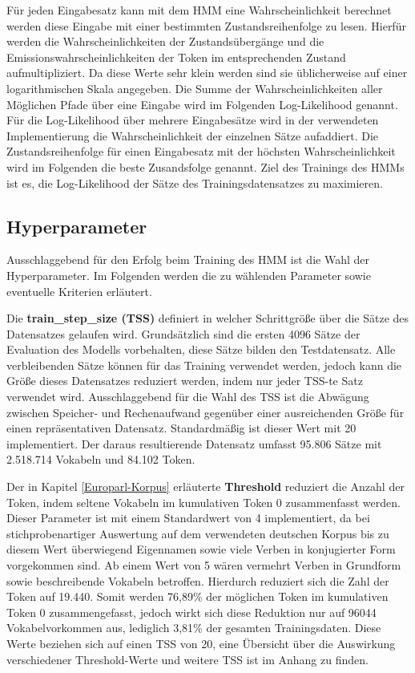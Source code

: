 \documentclass[conference]{IEEEtran}
\begin{document}
Für jeden Eingabesatz kann mit dem HMM eine Wahrscheinlichkeit berechnet werden diese Eingabe mit einer bestimmten Zustandsreihenfolge zu lesen.
Hierfür werden die Wahrscheinlichkeiten der Zustandsübergänge und die Emissionswahrscheinlichkeiten der Token im entsprechenden Zustand aufmultipliziert. 
Da diese Werte sehr klein werden sind sie üblicherweise auf einer logarithmischen Skala angegeben.
Die Summe der Wahrscheinlichkeiten aller Möglichen Pfade über eine Eingabe wird im Folgenden Log-Likelihood genannt.
Für die Log-Likelihood über mehrere Eingabesätze wird in der verwendeten Implementierung die Wahrscheinlichkeit der einzelnen Sätze aufaddiert.
Die Zustandsreihenfolge für einen Eingabesatz mit der höchsten Wahrscheinlichkeit wird im Folgenden die beste Zusandsfolge genannt.
Ziel des Trainings des HMMs ist es, die Log-Likelihood der Sätze des Trainingsdatensatzes zu maximieren.

\subsection{Hyperparameter}
Ausschlaggebend für den Erfolg beim Training des HMM ist die Wahl der Hyperparameter.
Im Folgenden werden die zu wählenden Parameter sowie eventuelle Kriterien erläutert.

Die \textbf{train\_step\_size (TSS)} definiert in welcher Schrittgröße über die Sätze des Datensatzes gelaufen wird. 
Grundsätzlich sind die ersten 4096 Sätze der Evaluation des Modells vorbehalten, diese Sätze bilden den Testdatensatz. 
Alle verbleibenden Sätze können für das Training verwendet werden, jedoch kann die Größe dieses Datensatzes reduziert werden, indem nur jeder TSS-te Satz verwendet wird. 
Ausschlaggebend für die Wahl des TSS ist die Abwägung zwischen Speicher- und Rechenaufwand gegenüber einer ausreichenden Größe für einen repräsentativen Datensatz. 
Standardmäßig ist dieser Wert mit 20 implementiert.
Der daraus resultierende Datensatz umfasst 95.806 Sätze mit 2.518.714 Vokabeln und 84.102 Token.

Der in Kapitel \ref{Europarl-Korpus} erläuterte \textbf{Threshold} reduziert die Anzahl der Token, indem seltene Vokabeln im kumulativen Token 0 zusammenfasst werden.
Dieser Parameter ist mit einem Standardwert von 4 implementiert, da bei stichprobenartiger Auswertung auf dem verwendeten deutschen Korpus bis zu diesem Wert überwiegend Eigennamen sowie viele Verben in konjugierter Form vorgekommen sind. 
Ab einem Wert von 5 wären vermehrt Verben in Grundform sowie beschreibende Vokabeln betroffen.
Hierdurch reduziert sich die Zahl der Token auf 19.440.
Somit werden 76,89\% der möglichen Token im kumulativen Token 0 zusammengefasst, jedoch wirkt sich diese Reduktion nur auf 96044 Vokabelvorkommen aus, lediglich 3,81\% der gesamten Trainingsdaten. 
Diese Werte beziehen sich auf einen TSS von 20, eine Übersicht über die Auswirkung verschiedener Threshold-Werte und weitere TSS ist im Anhang zu finden.
\end{document}
